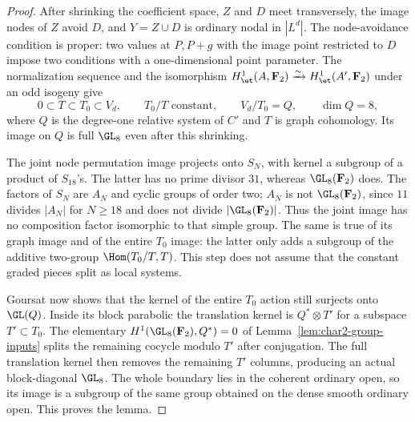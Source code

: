 \begin{proof}
After shrinking the coefficient space, $Z$ and $D$ meet transversely,
the image nodes of $Z$ avoid $D$, and $Y=Z\cup D$ is ordinary nodal in
$|L^d|$. The node-avoidance condition is proper: two values at $P,P+g$
with the image point restricted to $D$ impose two conditions with a
one-dimensional point parameter. The normalization sequence and the
isomorphism $H^1_{\et}(A,\mathbf F_2)\xrightarrow{\sim}
H^1_{\et}(A',\mathbf F_2)$ under an odd isogeny give
\[
 0\subset T\subset T_0\subset V_d,\qquad
 T_0/T\text{ constant},\qquad V_d/T_0=Q,
 \qquad\dim Q=8,
\]
where $Q$ is the degree-one relative system of $C'$ and $T$ is graph
cohomology. Its image on $Q$ is full $\GL_8$ even after this shrinking.

The joint node permutation image projects onto $S_N$, with kernel a
subgroup of a product of $S_{18}$'s. The latter has no prime divisor
$31$, whereas $\GL_8(\mathbf F_2)$ does. The factors of $S_N$ are
$A_N$ and cyclic groups of order two; $A_N$ is not $\GL_8(\mathbf F_2)$,
since $11$ divides $|A_N|$ for $N\ge18$ and does not divide
$|\GL_8(\mathbf F_2)|$. Thus the joint image has no composition factor
isomorphic to that simple group. The same is true of its graph image
and of the entire $T_0$ image: the latter only adds a subgroup of the
additive two-group $\Hom(T_0/T,T)$. This step does not assume that the
constant graded pieces split as local systems.

Goursat now shows that the kernel of the entire $T_0$ action still
surjects onto $\GL(Q)$. Inside its block parabolic the translation
kernel is $Q^*\otimes T'$ for a subspace $T'\subset T_0$.
The elementary $H^1(\GL_8(\mathbf F_2),Q^*)=0$ of
Lemma~\ref{lem:char2-group-inputs} splits the remaining cocycle modulo
$T'$ after conjugation. The full translation kernel then removes the
remaining $T'$ columns, producing an actual block-diagonal $\GL_8$.
The whole boundary lies in the coherent ordinary open, so its image is
a subgroup of the same group obtained on the dense smooth ordinary
open. This proves the lemma.
\end{proof}

